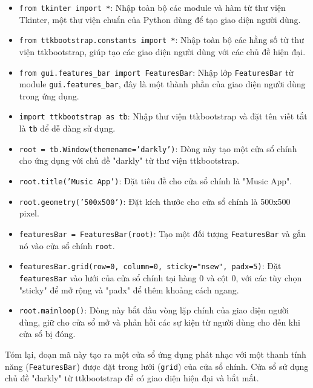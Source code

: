 \documentclass[a4paper]{article}
\begin{document}
\begin{itemize}
    \item \texttt{from tkinter import *}: Nhập toàn bộ các module và hàm từ thư viện Tkinter, một thư viện chuẩn của Python dùng để tạo giao diện người dùng.
    \item \texttt{from ttkbootstrap.constants import *}: Nhập toàn bộ các hằng số từ thư viện ttkbootstrap, giúp tạo các giao diện người dùng với các chủ đề hiện đại.
    \item \texttt{from gui.features\_bar import FeaturesBar}: Nhập lớp \texttt{FeaturesBar} từ module \texttt{gui.features\_bar}, đây là một thành phần của giao diện người dùng trong ứng dụng.
    \item \texttt{import ttkbootstrap as tb}: Nhập thư viện ttkbootstrap và đặt tên viết tắt là \texttt{tb} để dễ dàng sử dụng.
    \item \texttt{root = tb.Window(themename='darkly')}: Dòng này tạo một cửa sổ chính cho ứng dụng với chủ đề "darkly" từ thư viện ttkbootstrap.
    \item \texttt{root.title('Music App')}: Đặt tiêu đề cho cửa sổ chính là "Music App".
    \item \texttt{root.geometry('500x500')}: Đặt kích thước cho cửa sổ chính là 500x500 pixel.
    \item \texttt{featuresBar = FeaturesBar(root)}: Tạo một đối tượng \texttt{FeaturesBar} và gắn nó vào cửa sổ chính \texttt{root}.
    \item \texttt{featuresBar.grid(row=0, column=0, sticky="nsew", padx=5)}: Đặt \texttt{featuresBar} vào lưới của cửa sổ chính tại hàng 0 và cột 0, với các tùy chọn "sticky" để mở rộng và "padx" để thêm khoảng cách ngang.
    \item \texttt{root.mainloop()}: Dòng này bắt đầu vòng lặp chính của giao diện người dùng, giữ cho cửa sổ mở và phản hồi các sự kiện từ người dùng cho đến khi cửa sổ bị đóng.
\end{itemize}

Tóm lại, đoạn mã này tạo ra một cửa sổ ứng dụng phát nhạc với một thanh tính năng (\texttt{FeaturesBar}) được đặt trong lưới (\texttt{grid}) của cửa sổ chính. Cửa sổ sử dụng chủ đề "darkly" từ ttkbootstrap để có giao diện hiện đại và bắt mắt.
\end{document}
